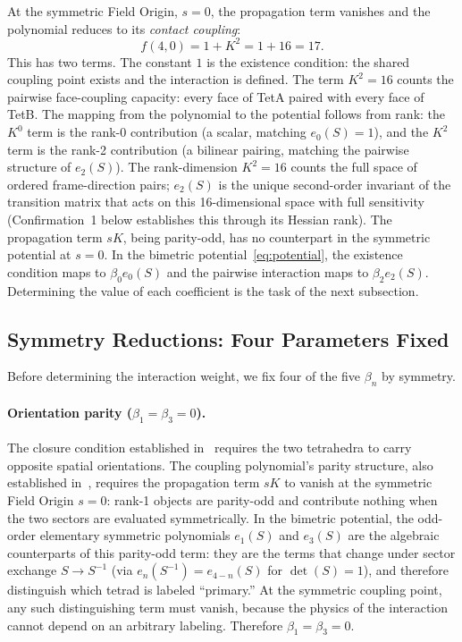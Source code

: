 \documentclass[a4paper,11pt]{article}
\begin{document}
At the symmetric Field Origin, $s = 0$, the propagation
term vanishes and the polynomial reduces to its
\emph{contact coupling}:
\begin{equation}
  f(4,0) = 1 + K^2 = 1 + 16 = 17.
\end{equation}
This has two terms. The constant $1$ is the
existence condition: the shared coupling point exists
and the interaction is defined. The term $K^2 = 16$
counts the pairwise face-coupling capacity: every face of
TetA paired with every face of TetB. The mapping from
the polynomial to the potential follows from rank: the
$K^0$ term is the rank-0 contribution (a scalar, matching
$e_0(S) = 1$), and the $K^2$ term is the rank-2
contribution (a bilinear pairing, matching the pairwise
structure of $e_2(S)$). The rank-dimension $K^2 = 16$
counts the full space of ordered frame-direction pairs;
$e_2(S)$ is the unique second-order invariant of the
transition matrix that acts on this 16-dimensional space
with full sensitivity (Confirmation~1 below establishes
this through its Hessian rank). The propagation term $sK$, being
parity-odd, has no counterpart in the symmetric potential
at $s = 0$. In the bimetric
potential~\eqref{eq:potential}, the existence condition
maps to $\beta_0 e_0(S)$ and the pairwise interaction
maps to $\beta_2 e_2(S)$. Determining the value of each
coefficient is the task of the next subsection.

\subsection{Symmetry Reductions: Four Parameters Fixed}
\label{sec:sym}

Before determining the interaction weight, we fix four
of the five $\beta_n$ by symmetry.

\paragraph{Orientation parity ($\beta_1 = \beta_3 = 0$).}
The closure condition established in~\cite{Nelson2026a}
requires the two tetrahedra to carry opposite spatial
orientations. The coupling polynomial's parity structure,
also established in~\cite{Nelson2026a}, requires the
propagation term $sK$ to vanish at the symmetric Field
Origin $s = 0$: rank-1 objects are parity-odd and
contribute nothing when the two sectors are evaluated
symmetrically. In the bimetric potential, the odd-order
elementary symmetric polynomials $e_1(S)$ and $e_3(S)$
are the algebraic counterparts of this parity-odd term:
they are the terms that change under sector exchange
$S \to S^{-1}$ (via $e_n(S^{-1}) = e_{4-n}(S)$ for
$\det(S) = 1$), and therefore distinguish which tetrad
is labeled ``primary.'' At the symmetric coupling point,
any such distinguishing term must vanish, because the
physics of the interaction cannot depend on an arbitrary
labeling. Therefore $\beta_1 = \beta_3 = 0$.
\end{document}
